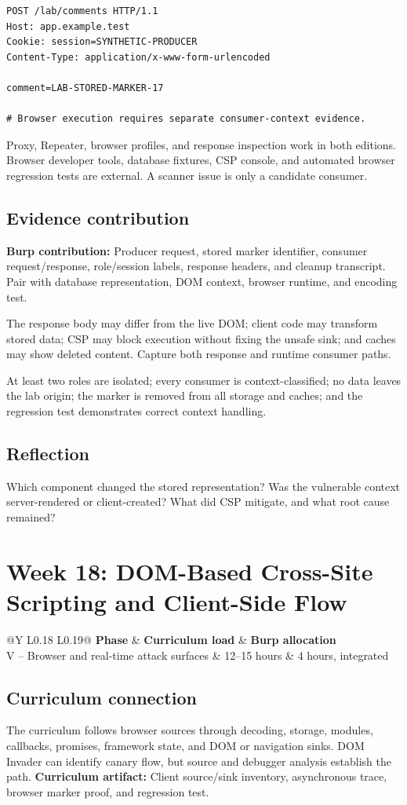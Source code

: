 \documentclass[11pt]{article}
\makeatletter
\newcommand{\weekheader}[5]{%
  \clearpage
  \section{Week #1: #2}
  \begin{tcolorbox}[colback=Navy,colframe=Navy,coltext=white]
    \begin{tabularx}{\linewidth}{@{}Y L{0.18\linewidth} L{0.19\linewidth}@{}}
      \textbf{Phase} & \textbf{Curriculum load} & \textbf{Burp allocation}\\
      #3 & #4 hours & #5 hours, integrated
    \end{tabularx}
  \end{tcolorbox}
}
\newcommand{\weekfield}[2]{%
  \Needspace{5\baselineskip}
  \subsection*{#1}
  #2
}
\newcommand{\curriculumartifact}[1]{\textbf{Curriculum artifact:} #1}
\newcommand{\burpevidence}[1]{\textbf{Burp contribution:} #1}
\makeatother
\begin{document}
\begin{lstlisting}[caption={Stored marker producer request}]
POST /lab/comments HTTP/1.1
Host: app.example.test
Cookie: session=SYNTHETIC-PRODUCER
Content-Type: application/x-www-form-urlencoded

comment=LAB-STORED-MARKER-17

# Browser execution requires separate consumer-context evidence.
\end{lstlisting}

\begin{editionbox}
Proxy, Repeater, browser profiles, and response inspection work in both editions.
Browser developer tools, database fixtures, CSP console, and automated browser
regression tests are external. A scanner issue is only a candidate consumer.
\end{editionbox}

\weekfield{Evidence contribution}{\burpevidence{Producer request, stored marker
identifier, consumer request/response, role/session labels, response headers, and
cleanup transcript.} Pair with database representation, DOM context, browser
runtime, and encoding test.}

\begin{troubleshootingbox}
The response body may differ from the live DOM; client code may transform stored
data; CSP may block execution without fixing the unsafe sink; and caches may show
deleted content. Capture both response and runtime consumer paths.
\end{troubleshootingbox}

\begin{checkpoints}
At least two roles are isolated; every consumer is context-classified; no data
leaves the lab origin; the marker is removed from all storage and caches; and the
regression test demonstrates correct context handling.
\end{checkpoints}

\weekfield{Reflection}{Which component changed the stored representation? Was
the vulnerable context server-rendered or client-created? What did CSP mitigate,
and what root cause remained?}

\weekheader{18}{DOM-Based Cross-Site Scripting and Client-Side Flow}{V -- Browser and real-time attack surfaces}{12--15}{4}

\weekfield{Curriculum connection}{The curriculum follows browser sources through
decoding, storage, modules, callbacks, promises, framework state, and DOM or
navigation sinks. DOM Invader can identify canary flow, but source and debugger
analysis establish the path. \curriculumartifact{Client source/sink inventory,
asynchronous trace, browser marker proof, and regression test.}}
\end{document}
